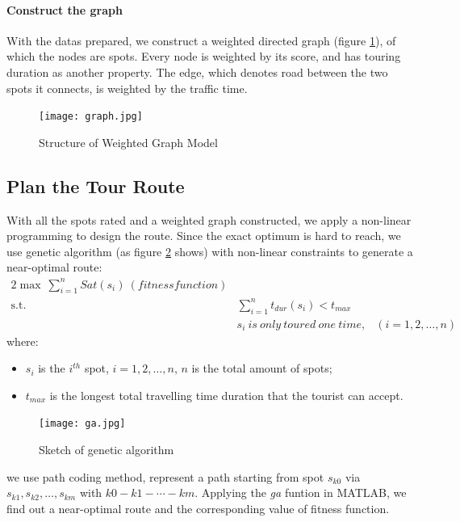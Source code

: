 \documentclass{mcmthesis}
\begin{document}
  \paragraph{Construct the graph} 

  With the datas prepared, we construct a weighted directed graph (figure \ref{fig:graph}), of which the nodes are spots. Every node is weighted by its score, and has touring duration as another property. The edge, which denotes road between the two spots it connects, is weighted by the traffic time.
  \begin{figure}[h]
    \centering
    \texttt{[image: graph.jpg]}
    \caption{Structure of Weighted Graph Model}
    \label{fig:graph}
  \end{figure}

\subsection{Plan the Tour Route}
  With all the spots rated and a weighted graph constructed, we apply a non-linear programming to design the route. Since the exact optimum is hard to reach, we use genetic algorithm (as figure \ref{fig:ga} shows) with non-linear constraints to generate a near-optimal route:
  \begin{alignat}{2}   %
    \max~\sum_{i=1}^{n}Sat(s_{i})~(fitness function)\\
    \mbox{s.t.}\quad
    &\sum_{i=1}^{n}t_{dur}(s_{i}) < t_{max}\\
    &s_{i}~is~only~toured~one~time, & (i=1,2,\ldots,n)
  \end{alignat}
  where:
  \begin{itemize}
    \item $s_{i}$ is the $i^{th}$ spot, $i=1,2,\ldots,n$, $n$ is the total amount of spots;
    \item $t_{max}$ is the longest total travelling time duration that the tourist can accept.
  \end{itemize}
  \begin{figure}[h]
    \centering
    \texttt{[image: ga.jpg]}
    \caption{Sketch of genetic algorithm}
    \label{fig:ga}
  \end{figure}
  we use path coding method, represent a path starting from spot $s_{k0}$ via $s_{k1}, s_{k2},\ldots,s_{km}$ with $k0-k1-\cdots-km$. Applying the \emph{ga} funtion in MATLAB, we find out a near-optimal route and the corresponding value of fitness function.
 
\end{document}
